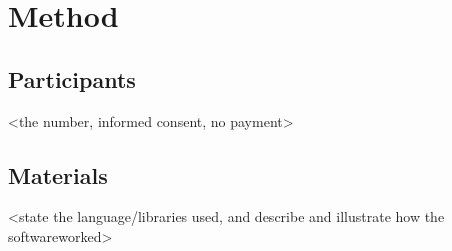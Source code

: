 \section{Method}

\subsection{Participants}
<the number, informed consent, no payment>

\subsection{Materials}
<state the language/libraries used, and describe and illustrate how the softwareworked>

